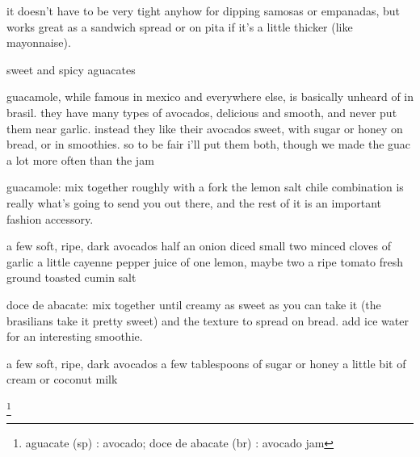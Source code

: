 it doesn't have to be very tight anyhow for dipping samosas or empanadas, but works great as a sandwich spread or on pita if it's a little thicker (like mayonnaise).

sweet and spicy aguacates

guacamole, while famous in mexico and everywhere else, is basically unheard of in brasil. they have many types of avocados, delicious and smooth, and never put them near garlic. instead they like their avocados sweet, with sugar or honey on bread, or in smoothies. so to be fair i'll put them both, though we made the guac a lot more often than the jam

	guacamole:
		mix together roughly with a fork
		the lemon salt chile combination is really what's going to send you out there, and the rest of it is an important fashion accessory.

a few soft, ripe, dark avocados
half an onion diced small
two minced cloves of garlic
a little cayenne pepper
juice of one lemon, maybe two
a ripe tomato
fresh ground toasted cumin
salt
	

	doce de abacate:
		mix together until creamy
		as sweet as you can take it (the brasilians take it pretty sweet) and the texture to spread on bread. add ice water for an interesting smoothie.

a few soft, ripe, dark avocados
a few tablespoons of sugar or honey
a little bit of cream or coconut milk

\footnote{aguacate (sp) : avocado;   doce de abacate (br) : avocado jam}
